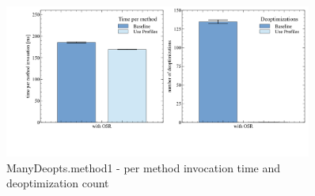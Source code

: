\\\\\\\\\\\\
\begin{figure}[ht!]
  \begin{center}
    \centering
    \includegraphics[width=0.9\textwidth]{figures/manydeopt.png}
    \caption{ManyDeopts.method1 - per method invocation time and deoptimization count}
    \label{f:manydeopts}
  \end{center}
\end{figure}
\\\\
